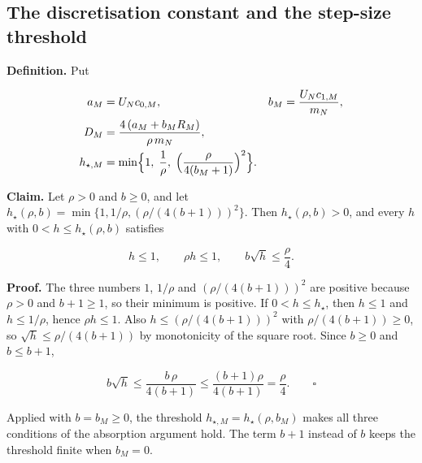 \documentclass[11pt,a4paper]{report}
\begin{document}
\subsection{\texorpdfstring{The discretisation constant and the step-size threshold}{The discretisation constant and the step-size threshold}}


\textbf{Definition.} Put


\[\begin{aligned}a_M&=U_Nc_{0,M},&b_M&=\frac{U_Nc_{1,M}}{m_N},\\D_M&=\frac{4\,(a_M+b_MR_M)}{\rho\,m_N},\\h_{\star,M}&=\min\Bigl\{1,\;\frac1\rho,\;\Bigl(\frac{\rho}{4(b_M+1)}\Bigr)^2\Bigr\}.\end{aligned}\]


\textbf{Claim.} Let \(\rho>0\) and \(b\ge0\), and let \(h_\star(\rho,b)=\min\{1,1/\rho,(\rho/(4(b+1)))^2\}\). Then \(h_\star(\rho,b)>0\), and every \(h\) with \(0<h\le h_\star(\rho,b)\) satisfies


\[h\le1,\qquad\rho h\le1,\qquad b\sqrt h\le\frac\rho4 .\]


\textbf{Proof.} The three numbers \(1\), \(1/\rho\) and \((\rho/(4(b+1)))^2\) are positive because \(\rho>0\) and \(b+1\ge1\), so their minimum is positive. If \(0<h\le h_\star\), then \(h\le1\) and \(h\le1/\rho\), hence \(\rho h\le1\). Also \(h\le(\rho/(4(b+1)))^2\) with \(\rho/(4(b+1))\ge0\), so \(\sqrt h\le\rho/(4(b+1))\) by monotonicity of the square root. Since \(b\ge0\) and \(b\le b+1\),


\[b\sqrt h\le\frac{b\,\rho}{4(b+1)}\le\frac{(b+1)\rho}{4(b+1)}=\frac\rho4. \qquad\square\]


Applied with \(b=b_M\ge0\), the threshold \(h_{\star,M}=h_\star(\rho,b_M)\) makes all three conditions of the absorption argument hold. The term \(b+1\) instead of \(b\) keeps the threshold finite when \(b_M=0\).
\end{document}
